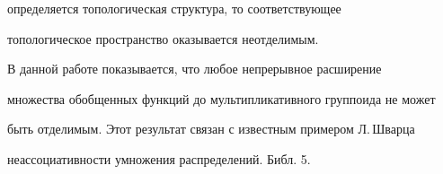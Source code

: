 определяется топологическая структура, то соответствующее 


топологическое пространство оказывается неотделимым. 


 


В данной работе показывается, что любое непрерывное расширение 


множества обобщенных функций до мультипликативного группоида не может 


быть отделимым. Этот результат связан с известным примером Л.\,Шварца 


неассоциативности умножения распределений. Библ. 5. 


 





 


 


 


